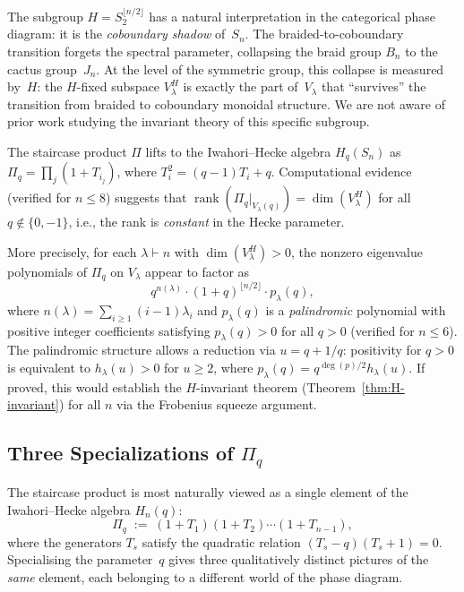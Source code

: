 \begin{remark}
\label{rem:pair-subgroup}
The subgroup $H = S_2^{\lfloor n/2 \rfloor}$ has a natural interpretation
in the categorical phase diagram: it is the \emph{coboundary shadow}
of~$S_n$.  The braided-to-coboundary transition forgets the spectral
parameter, collapsing the braid group $B_n$ to the cactus group~$J_n$.
At the level of the symmetric group, this collapse is measured by~$H$:
the $H$-fixed subspace $V_\lambda^H$ is exactly the part of~$V_\lambda$
that ``survives'' the transition from braided to coboundary monoidal
structure.  We are not aware of prior work studying the invariant
theory of this specific subgroup.
\end{remark}

\begin{remark}
\label{rem:hecke-rank-constancy}
The staircase product $\Pi$ lifts to the Iwahori--Hecke algebra $H_q(S_n)$ as
$\Pi_q = \prod_{j} (1 + T_{i_j})$, where $T_i^2 = (q-1)T_i + q$.
Computational evidence (verified for $n \leq 8$) suggests that
$\operatorname{rank}(\Pi_q|_{V_\lambda(q)}) = \dim(V_\lambda^H)$ for all
$q \notin \{0, -1\}$, i.e., the rank is \emph{constant} in the Hecke parameter.

More precisely, for each $\lambda \vdash n$ with $\dim(V_\lambda^H) > 0$,
the nonzero eigenvalue polynomials of $\Pi_q$ on $V_\lambda$ appear to factor as
\[
  q^{n(\lambda)} \cdot (1+q)^{\lfloor n/2 \rfloor} \cdot p_\lambda(q),
\]
where $n(\lambda) = \sum_{i \geq 1} (i-1)\lambda_i$ and $p_\lambda(q)$ is a
\emph{palindromic} polynomial with positive integer coefficients satisfying
$p_\lambda(q) > 0$ for all $q > 0$ (verified for $n \leq 6$).
The palindromic structure allows a reduction via $u = q + 1/q$: positivity for
$q > 0$ is equivalent to $h_\lambda(u) > 0$ for $u \geq 2$, where
$p_\lambda(q) = q^{\deg(p)/2} h_\lambda(u)$.
If proved, this would establish the $H$-invariant theorem
(Theorem~\ref{thm:H-invariant}) for all $n$ via the Frobenius squeeze argument.
\end{remark}


\subsection{Three Specializations of $\Pi_q$}
\label{subsec:three-specializations}

The staircase product is most naturally viewed as a single element of
the Iwahori--Hecke algebra $H_n(q)$:
\[
  \Pi_q \;:=\; (1 + T_1)(1 + T_2) \cdots (1 + T_{n-1}),
\]
where the generators $T_s$ satisfy the quadratic relation
$(T_s - q)(T_s + 1) = 0$.  Specialising the parameter~$q$ gives three
qualitatively distinct pictures of the \emph{same} element, each
belonging to a different world of the phase diagram.

